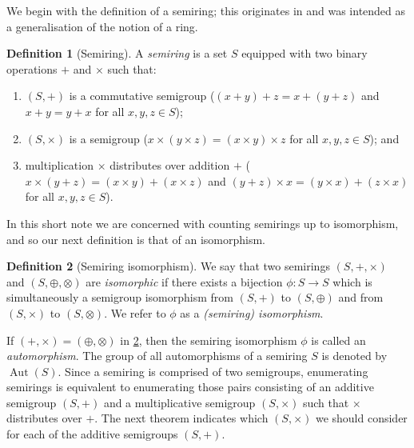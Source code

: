\documentclass{article}
\theoremstyle{definition}
\newtheorem{defn}{Definition}[section]
\theoremstyle{plain}
\newcommand{\Aut}{\operatorname{Aut}}
\begin{document}
We begin with the definition of a semiring; this originates in
\cite{} and was intended as a generalisation of the notion of a ring.

\begin{defn}[Semiring]
  \label{def:semiring}
  A \emph{semiring} is a set \(S\) equipped with two binary
  operations \(+\) and  \(\times\) such that:
  \begin{enumerate}
    \item \((S, +)\) is a commutative semigroup ($(x + y) + z = x + (y + z)$
      and $x + y = y + x$ for all $x, y, z\in S$);
    \item \((S, \times)\) is a semigroup ($x\times (y \times z) = (x\times
      y)\times z$ for all $x,y, z\in S$); and
    \item multiplication $\times$ distributes over addition $+$
      ($x \times (y + z) = (x \times y) + (x \times z)$ and
      $(y + z) \times x = (y \times x) + (z \times x)$ for all $x, y, z \in S$).
  \end{enumerate}
\end{defn}

In this short note we are concerned with counting semirings up to isomorphism,
and so our next definition is that of an isomorphism.


\begin{defn}[Semiring isomorphism]\label{defn-semiring-iso}
  We say that two semirings \((S,+,\times)\) and \((S, \oplus, \otimes)\) are
  \emph{isomorphic} if there exists a bijection \(\phi: S \to S\) which is
  simultaneously a semigroup isomorphism from $(S, +)$ to $(S, \oplus)$ and
  from $(S, \times)$ to $(S, \otimes)$. We refer to $\phi$ as a
  \textit{(semiring) isomorphism}.
\end{defn}

If \((+,\times)=(\oplus, \otimes)\) in \cref{defn-semiring-iso}, then the
semiring isomorphism $\phi$ is called an \textit{automorphism}. The group of
all automorphisms of a semiring $S$ is denoted by $\Aut(S)$.
Since a semiring is comprised of two semigroups, enumerating semirings is
equivalent to enumerating those pairs consisting of an additive semigroup $(S,
+)$ and a multiplicative semigroup $(S, \times)$ such that $\times$ distributes
over $+$. The next theorem indicates which $(S, \times)$ we should consider
for each of the additive semigroups $(S, +)$.
\end{document}
